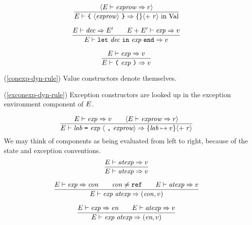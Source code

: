 \begin{equation}	%
\frac{\langle\E\ts\labexps\ra\r\rangle}
     {\E\ts\lttbrace\ \recexp\ \rttbrace\ra\emptymap
                                  \langle +\ \r\rangle\ \In\ \Val}
\end{equation}

\begin{equation}        %
\frac{\E\ts\dec\ra\E'\qquad\E+\E'\ts\exp\ra\V}
     {\E\ts\letexp\ra\V}
\end{equation}

\begin{equation}	%
\frac{\E\ts\exp\ra\V}
     {\E\ts\parexp\ra\V}
\end{equation}
\comments
\begin{description}
\item{(\ref{conexp-dyn-rule})}
   Value constructors denote themselves.
\item{(\ref{exconexp-dyn-rule})}
   Exception constructors are looked up in the exception environment
   component of $E$.
\end{description}

\begin{equation}	%
\frac{\E\ts\exp\ra\V\qquad\langle\E\ts\labexps\ra\r\rangle}
     {\E\ts\longlabexps\ra\{\lab\mapsto\V\}\langle +\ \r\rangle}\index{52.2}
\end{equation}
\comment We may think of components as being evaluated from left to right,
because of the state and exception conventions.
%
%
\begin{equation}	%
\frac{\E\ts\atexp\ra\V}
     {\E\ts\atexp\ra\V}\index{52.3}
\end{equation}

\begin{equation}	%
\label{conapp-dyn-rule}
\frac{\E\ts\exp\ra\con\qquad\con\neq\REF\qquad\E\ts\atexp\ra\V}
     {\E\ts\appexp\ra(\con,\V)}
\end{equation}

\begin{equation}        %
\frac{\E\ts\exp\ra\e\qquad\E\ts\atexp\ra\V}
     {\E\ts\appexp\ra(\e,\V)}
\end{equation}

